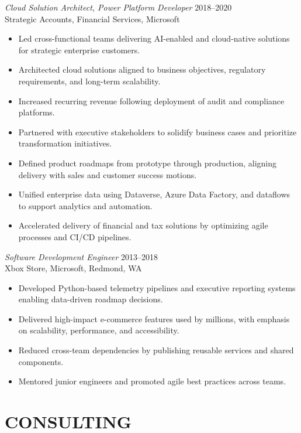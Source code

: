 \documentclass[margin]{res}
\begin{document}
\begin{resume}
{\sl Cloud Solution Architect, Power Platform Developer} \hfill 2018--2020\\
Strategic Accounts, Financial Services, Microsoft
\begin{itemize}
\item Led cross-functional teams delivering AI-enabled and cloud-native solutions for strategic enterprise customers.
\item Architected cloud solutions aligned to business objectives, regulatory requirements, and long-term scalability.
\item Increased recurring revenue following deployment of audit and compliance platforms.
\item Partnered with executive stakeholders to solidify business cases and prioritize transformation initiatives.
\item Defined product roadmaps from prototype through production, aligning delivery with sales and customer success motions.
\item Unified enterprise data using Dataverse, Azure Data Factory, and dataflows to support analytics and automation.
\item Accelerated delivery of financial and tax solutions by optimizing agile processes and CI/CD pipelines.
\end{itemize}

{\sl Software Development Engineer} \hfill 2013--2018\\
Xbox Store, Microsoft, Redmond, WA
\begin{itemize}
\item Developed Python-based telemetry pipelines and executive reporting systems enabling data-driven roadmap decisions.
\item Delivered high-impact e-commerce features used by millions, with emphasis on scalability, performance, and accessibility.
\item Reduced cross-team dependencies by publishing reusable services and shared components.
\item Mentored junior engineers and promoted agile best practices across teams.
\end{itemize}

\section{CONSULTING}


\end{resume}
\end{document}
